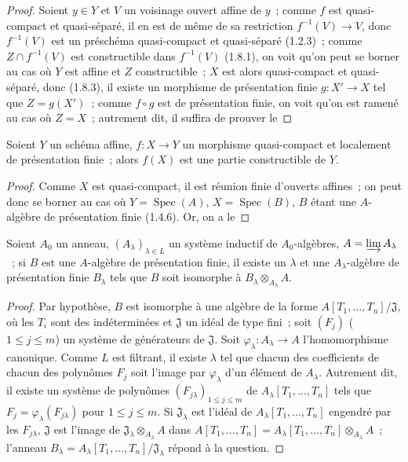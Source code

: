 \begin{proof}
Soient $y\in Y$ et $V$ un voisinage ouvert affine de $y$~; comme $f$ est
quasi-compact et quasi-séparé, il en est de même de sa restriction
$f^{-1}(V)\to V$, donc $f^{-1}(V)$ est un préschéma quasi-compact et
quasi-séparé (1.2.3)~; comme $Z\cap f^{-1}(V)$ est constructible dans
$f^{-1}(V)$ (1.8.1), on voit qu'on peut se borner au cas où $Y$ est affine
et $Z$ constructible~; $X$ est alors quasi-compact et quasi-séparé, donc
(1.8.3), il existe un morphisme de présentation finie $g:X'\to X$ tel que
$Z=g(X')$~; comme $f\circ g$ est de présentation finie, on voit qu'on est
ramené au cas où $Z=X$~; autrement dit, il suffira de prouver le
\end{proof}

\begin{lemma}[1.8.4.1]
\label{IV.1.8.4.1-fr}
Soient $Y$ un schéma affine, $f:X\to Y$ un morphisme quasi-compact et
localement de présentation finie~; alors $f(X)$ est une partie constructible
de $Y$.
\end{lemma}

\begin{proof}
Comme $X$ est quasi-compact, il est réunion finie d'ouverts affines~; on peut
donc se borner au cas où $Y=\operatorname{Spec}(A)$,
$X=\operatorname{Spec}(B)$, $B$ étant une $A$-algèbre de présentation finie
(1.4.6). Or, on a le
\end{proof}

\begin{lemma}[1.8.4.2]
\label{IV.1.8.4.2-fr}
Soient $A_0$ un anneau, $(A_\lambda)_{\lambda\in L}$ un système inductif de
$A_0$-algèbres, $A=\varinjlim A_\lambda$~; si $B$ est une $A$-algèbre de
présentation finie, il existe un $\lambda$ et une $A_\lambda$-algèbre de
présentation finie $B_\lambda$ tels que $B$ soit isomorphe à
$B_\lambda\otimes_{A_\lambda}A$.
\end{lemma}

\begin{proof}
Par hypothèse, $B$ est isomorphe à une algèbre de la forme
$A[T_1,\ldots,T_n]/\mathfrak J$, où les $T_i$ sont des indéterminées et
$\mathfrak J$ un idéal de type fini~; soit $(F_j)$ ($1\leq j\leq m$) un
système de générateurs de $\mathfrak J$. Soit
$\varphi_\lambda:A_\lambda\to A$ l'homomorphisme canonique. Comme $L$ est
filtrant, il existe $\lambda$ tel que chacun des coefficients de chacun des
polynômes $F_j$ soit l'image par $\varphi_\lambda$ d'un élément de
$A_\lambda$. Autrement dit, il existe un système de polynômes
$(F_{j\lambda})_{1\leq j\leq m}$ de $A_\lambda[T_1,\ldots,T_n]$ tels que
$F_j=\varphi_\lambda(F_{j\lambda})$ pour $1\leq j\leq m$. Si
$\mathfrak J_\lambda$ est l'idéal de $A_\lambda[T_1,\ldots,T_n]$ engendré
par les $F_{j\lambda}$, $\mathfrak J$ est l'image de
$\mathfrak J_\lambda\otimes_{A_\lambda}A$ dans
$A[T_1,\ldots,T_n]=A_\lambda[T_1,\ldots,T_n]\otimes_{A_\lambda}A$~;
l'anneau $B_\lambda=A_\lambda[T_1,\ldots,T_n]/\mathfrak J_\lambda$ répond à
la question.
\end{proof}

